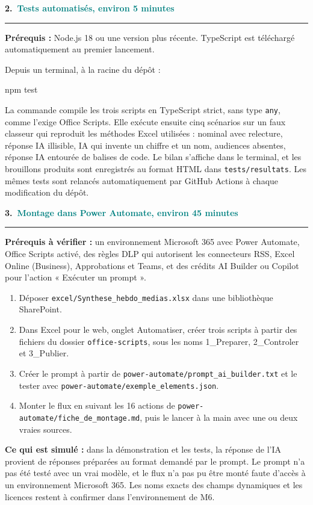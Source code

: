 \documentclass[10pt,a4paper]{article}
\newcommand{\partie}[2]{%
  {\Large\bfseries #1.\ \textcolor{teal}{#2}}\par\vspace{3pt}
  {\color{black!20}\rule{\linewidth}{0.4pt}}\par\vspace{4pt}}
\newcommand{\cadre}[1]{\textbf{\color{ardoise}#1 :}}
\newcommand{\humain}[1]{\textbf{\color{amber!85!black}#1 :}}
\newcommand{\verif}[1]{\textbf{\color{brique}#1 :}}
\begin{document}
\vspace{8pt}\partie{2}{Tests automatisés, environ 5 minutes}

\cadre{Prérequis} Node.js 18 ou une version plus récente. TypeScript est téléchargé automatiquement au premier lancement.

Depuis un terminal, à la racine du dépôt :
\begin{commande}
npm test
\end{commande}
La commande compile les trois scripts en TypeScript strict, sans type \texttt{any}, comme l’exige Office Scripts. Elle exécute ensuite cinq scénarios sur un faux classeur qui reproduit les méthodes Excel utilisées : nominal avec relecture, réponse IA illisible, IA qui invente un chiffre et un nom, audiences absentes, réponse IA entourée de balises de code. Le bilan s’affiche dans le terminal, et les brouillons produits sont enregistrés au format HTML dans \texttt{tests/resultats}. Les mêmes tests sont relancés automatiquement par GitHub Actions à chaque modification du dépôt.

\vspace{8pt}\partie{3}{Montage dans Power Automate, environ 45 minutes}

\verif{Prérequis à vérifier} un environnement Microsoft 365 avec Power Automate, Office Scripts activé, des règles DLP qui autorisent les connecteurs RSS, Excel Online (Business), Approbations et Teams, et des crédits AI Builder ou Copilot pour l’action « Exécuter un prompt ».
\begin{enumerate}
\item Déposer \texttt{excel/Synthese\_hebdo\_medias.xlsx} dans une bibliothèque SharePoint.
\item Dans Excel pour le web, onglet Automatiser, créer trois scripts à partir des fichiers du dossier \texttt{office-scripts}, sous les noms 1\_Preparer, 2\_Controler et 3\_Publier.
\item Créer le prompt à partir de \texttt{power-automate/prompt\_ai\_builder.txt} et le tester avec \texttt{power-automate/exemple\_elements.json}.
\item Monter le flux en suivant les 16 actions de \texttt{power-automate/fiche\_de\_montage.md}, puis le lancer à la main avec une ou deux vraies sources.
\end{enumerate}

\begin{encadre}
\humain{Ce qui est simulé} dans la démonstration et les tests, la réponse de l’IA provient de réponses préparées au format demandé par le prompt. Le prompt n’a pas été testé avec un vrai modèle, et le flux n’a pas pu être monté faute d’accès à un environnement Microsoft 365. Les noms exacts des champs dynamiques et les licences restent à confirmer dans l’environnement de M6.
\end{encadre}
\end{document}
